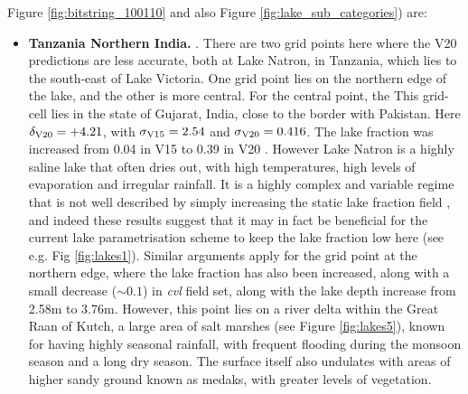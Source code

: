 \documentclass[hess, twostagejnl]{copernicus}
\providecommand{\DIFadd}[1]{{\protect\color{blue} \sf #1}} %
\providecommand{\DIFdel}[1]{{\protect\color{red} \scriptsize #1}} %
\providecommand{\DIFaddbegin}{} %
\providecommand{\DIFaddend}{} %
\providecommand{\DIFdelbegin}{} %
\providecommand{\DIFdelend}{} %
\begin{document}
\DIFadd{Figure \ref{fig:bitstring_100110} and also Figure \ref{fig:lake_sub_categories}) are}\DIFaddend :
\begin{itemize}
	
\DIFaddbegin 

		\DIFaddend \item \textbf{\DIFdelbegin \DIFdel{Tanzania}\DIFdelend \DIFaddbegin \DIFadd{Northern India.}\DIFaddend } \DIFdelbegin \DIFdel{. There are two grid points here where the V20 predictions are less accurate, both at Lake Natron, in Tanzania, which lies to the south-east of Lake Victoria. One grid point lies on the northern edge of the lake, and the other is more central. For the central point, the }\DIFdelend \DIFaddbegin \DIFadd{This grid-cell lies in the state of Gujarat, India, close to the border with Pakistan. Here $\delta_{\rm V20} = +4.21$, with $\sigma_{\rm V15} = 2.54$ and $\sigma_{\rm V20}=0.416$. The }\DIFaddend lake fraction was increased from \DIFdelbegin \DIFdel{0.04 }\DIFdelend \DIFaddbegin \DIFadd{0.59 }\DIFaddend in V15 to \DIFdelbegin \DIFdel{0.39 }\DIFdelend \DIFaddbegin \DIFadd{0.71 }\DIFaddend in V20 \DIFdelbegin \DIFdel{. However Lake Natron is a highly saline lake that often dries out, with high temperatures, high levels of evaporation and irregular rainfall. It is a highly complex and variable regime that is not well described by simply increasing the static lake fraction field , and indeed these results suggest that it may in fact be beneficial for the current lake parametrisation scheme to keep the lake fraction low here (see e.g. Fig \ref{fig:lakes1}). Similar arguments apply for the grid point at the northern edge, where the lake fraction has also been increased, along with a small decrease ($\sim 0.1$) in \textit{cvl}}\DIFdelend \DIFaddbegin \DIFadd{field set, along with the lake depth increase from 2.58m to 3.76m. However, this point lies on a river delta within the Great Raan of Kutch, a large area of salt marshes (see Figure \ref{fig:lakes5}), known for having highly seasonal rainfall, with frequent flooding during the monsoon season and a long dry season. The surface itself also undulates with areas of higher sandy ground known as medaks, with greater levels of vegetation}\DIFaddend . \DIFdelbegin %


\end{itemize}
\end{document}
